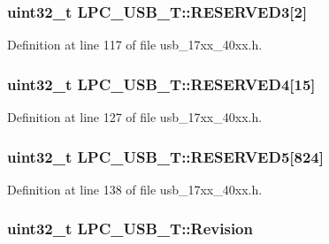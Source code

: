 \subsubsection[{\texorpdfstring{R\+E\+S\+E\+R\+V\+E\+D3}{RESERVED3}}]{\setlength{\rightskip}{0pt plus 5cm}uint32\+\_\+t L\+P\+C\+\_\+\+U\+S\+B\+\_\+\+T\+::\+R\+E\+S\+E\+R\+V\+E\+D3\mbox{[}2\mbox{]}}\hypertarget{structLPC__USB__T_a89802335cc487853dceb4ae91aa73718}{}\label{structLPC__USB__T_a89802335cc487853dceb4ae91aa73718}


Definition at line 117 of file usb\+\_\+17xx\+\_\+40xx.\+h.

\subsubsection[{\texorpdfstring{R\+E\+S\+E\+R\+V\+E\+D4}{RESERVED4}}]{\setlength{\rightskip}{0pt plus 5cm}uint32\+\_\+t L\+P\+C\+\_\+\+U\+S\+B\+\_\+\+T\+::\+R\+E\+S\+E\+R\+V\+E\+D4\mbox{[}15\mbox{]}}\hypertarget{structLPC__USB__T_a7eca62c20542b29cf41a58284f8312d3}{}\label{structLPC__USB__T_a7eca62c20542b29cf41a58284f8312d3}


Definition at line 127 of file usb\+\_\+17xx\+\_\+40xx.\+h.

\subsubsection[{\texorpdfstring{R\+E\+S\+E\+R\+V\+E\+D5}{RESERVED5}}]{\setlength{\rightskip}{0pt plus 5cm}uint32\+\_\+t L\+P\+C\+\_\+\+U\+S\+B\+\_\+\+T\+::\+R\+E\+S\+E\+R\+V\+E\+D5\mbox{[}824\mbox{]}}\hypertarget{structLPC__USB__T_abcb46c9afd665765603f695918bd1bc8}{}\label{structLPC__USB__T_abcb46c9afd665765603f695918bd1bc8}


Definition at line 138 of file usb\+\_\+17xx\+\_\+40xx.\+h.

\subsubsection[{\texorpdfstring{Revision}{Revision}}]{ uint32\+\_\+t L\+P\+C\+\_\+\+U\+S\+B\+\_\+\+T\+::\+Revision}\hypertarget{structLPC__USB__T_aa3eac0d60e5474925416501b67c27936}{}\label{structLPC__USB__T_aa3eac0d60e5474925416501b67c27936}


